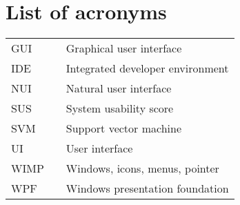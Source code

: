 \chapter*{List of acronyms}

\setlength{\LTleft}{0pt}
\begin{longtable}{lll}
GUI	& \phantom{xxxxxxx} & Graphical user interface\\
IDE & \phantom{xxxxxxx} & Integrated developer environment\\
NUI & \phantom{xxxxxxx} & Natural user interface\\
SUS & \phantom{xxxxxxx} & System usability score\\
SVM	& \phantom{xxxxxxx} & Support vector machine\\
UI  & \phantom{xxxxxxx} & User interface\\
WIMP & \phantom{xxxxxxx} & Windows, icons, menus, pointer\\
WPF & \phantom{xxxxxxx} & Windows presentation foundation
\end{longtable}